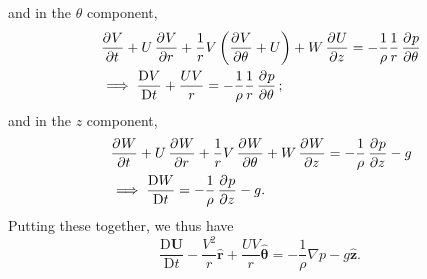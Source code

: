 \documentclass{article}
\def\*#1{\mathbf{#1}}
\newcommand{\rhat}{\mathbf{\hat{r}}}
\newcommand{\thetahat}{\boldsymbol{\hat{\theta}}}
\newcommand{\zhat}{\mathbf{\hat{z}}}
\newcommand{\dadvd}[2]{\dfrac{\text{D} #1}{\text{D} #2}} %
\begin{document}
%
and in the $\theta$ component,
%
\begin{align*}
    &\dpd{V}{t}
    + U \dpd{V}{r}
    + \frac{1}{r} V \del{\dpd{V}{\theta} + U}
    + W \dpd{U}{z}
    =
    - \frac{1}{\rho} \frac{1}{r} \dpd{p}{\theta}
    \\
    &\implies
    \dadvd{V}{t} + \frac{U V}{r}
    =
    - \frac{1}{\rho} \frac{1}{r} \dpd{p}{\theta}
    ;
\end{align*}
%
and in the $z$ component,
%
\begin{align*}
    &\dpd{W}{t}
    + U \dpd{W}{r}
    + \frac{1}{r} V \dpd{W}{\theta}
    + W \dpd{W}{z}
    =
    - \frac{1}{\rho} \dpd{p}{z} - g
    \\
    &\implies
    \dadvd{W}{t}
    =
    - \frac{1}{\rho} \dpd{p}{z} - g
    .
\end{align*}
%
Putting these together, we thus have
%
\begin{equation*}
    \dadvd{\*U}{t} - \frac{V^2}{r} \rhat + \frac{U V}{r} \thetahat
        = - \frac{1}{\rho} \nabla p - g \zhat
    .
\end{equation*}
\end{document}
